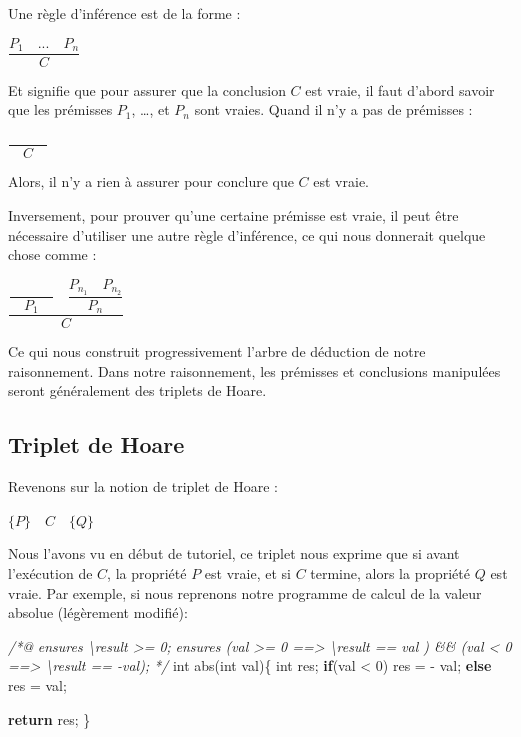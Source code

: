 \documentclass[12pt,francais,]{scrbook}
\newenvironment{Shaded}{}{}
\newcommand{\KeywordTok}[1]{\textcolor[rgb]{0.00,0.44,0.13}{\textbf{{#1}}}}
\newcommand{\DataTypeTok}[1]{\textcolor[rgb]{0.56,0.13,0.00}{{#1}}}
\newcommand{\DecValTok}[1]{\textcolor[rgb]{0.25,0.63,0.44}{{#1}}}
\newcommand{\CommentTok}[1]{\textcolor[rgb]{0.38,0.63,0.69}{\textit{{#1}}}}
\newcommand{\NormalTok}[1]{{#1}}
\begin{document}
Une règle d'inférence est de la forme :

\begin{center} \(\dfrac{P_1 \quad ... \quad P_n}{C}\) \end{center}

Et signifie que pour assurer que la conclusion \(C\) est vraie, il faut
d'abord savoir que les prémisses \(P_1\), \ldots{}, et \(P_n\) sont
vraies. Quand il n'y a pas de prémisses :

\begin{center} \(\dfrac{}{\quad C \quad}\) \end{center}

Alors, il n'y a rien à assurer pour conclure que \(C\) est vraie.

Inversement, pour prouver qu'une certaine prémisse est vraie, il peut
être nécessaire d'utiliser une autre règle d'inférence, ce qui nous
donnerait quelque chose comme :

\begin{center}
\(\dfrac{\dfrac{}{\quad P_1\quad} \quad \dfrac{P_{n_1}\quad P_{n_2}}{P_n}}{C}\)
\end{center}

Ce qui nous construit progressivement l'arbre de déduction de notre
raisonnement. Dans notre raisonnement, les prémisses et conclusions
manipulées seront généralement des triplets de Hoare.

\subsection{Triplet de Hoare}\label{triplet-de-hoare}

Revenons sur la notion de triplet de Hoare :

\begin{center} \(\{ P \}\quad C\quad \{ Q \}\) \end{center}

Nous l'avons vu en début de tutoriel, ce triplet nous exprime que si
avant l'exécution de \(C\), la propriété \(P\) est vraie, et si \(C\)
termine, alors la propriété \(Q\) est vraie. Par exemple, si nous
reprenons notre programme de calcul de la valeur absolue (légèrement
modifié):

\begin{footnotesize}\begin{Shaded}
\begin{Highlighting}[]
\CommentTok{/*@}
\CommentTok{  ensures \textbackslash{}result >= 0;}
\CommentTok{  ensures (val >= 0 ==> \textbackslash{}result == val ) && (val <  0 ==> \textbackslash{}result == -val);}
\CommentTok{*/}
\DataTypeTok{int} \NormalTok{abs(}\DataTypeTok{int} \NormalTok{val)\{}
  \DataTypeTok{int} \NormalTok{res;}
  \KeywordTok{if}\NormalTok{(val < }\DecValTok{0}\NormalTok{) res = - val;}
  \KeywordTok{else}        \NormalTok{res = val;}

  \KeywordTok{return} \NormalTok{res;}
\NormalTok{\}}
\end{Highlighting}
\end{Shaded}\end{footnotesize}
\end{document}
